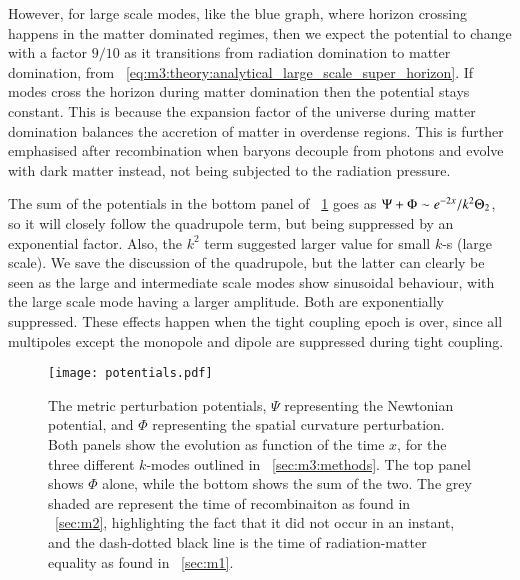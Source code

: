    However, for large scale modes, like the blue graph, where horizon crossing happens in the matter dominated regimes, then we expect the potential to change with a factor $9/10$ as it transitions from radiation domination to matter domination, from ~\cref{eq:m3:theory:analytical_large_scale_super_horizon}. If modes cross the horizon during matter domination then the potential stays constant. This is because the expansion factor of the universe during matter domination balances the accretion of matter in overdense regions. This is further emphasised after recombination when baryons decouple from photons and evolve with dark matter instead, not being subjected to the radiation pressure. 
    
    The sum of the potentials in the bottom panel of ~\cref{fig:m3:potentials} goes as $\Psi+\Phi \sim e^{-2x}/k^2\Theta_2$, so it will closely follow the quadrupole term, but being suppressed by an exponential factor. Also, the $k^2$ term suggested larger value for small $k$-s (large scale). We save the discussion of the quadrupole, but the latter can clearly be seen as the large and intermediate scale modes show sinusoidal behaviour, with the large scale mode having a larger amplitude. Both are exponentially suppressed. These effects happen when the tight coupling epoch is over, since all multipoles except the monopole and dipole are suppressed during tight coupling. 
    \begin{figure}
        \texttt{[image: potentials.pdf]}
        \caption{The metric perturbation potentials, $\Psi$ representing the Newtonian potential, and $\Phi$ representing the spatial curvature perturbation. Both panels show the evolution as function of the time $x$, for the three different $k$-modes outlined in ~\cref{sec:m3:methods}. The top panel shows $\Phi$ alone, while the bottom shows the sum of the two. The grey shaded are represent the time of recombinaiton as found in ~\cref{sec:m2}, highlighting the fact that it did not occur in an instant, and the dash-dotted black line is the time of radiation-matter equality as found in ~\cref{sec:m1}.}
        \label{fig:m3:potentials}
    \end{figure}

